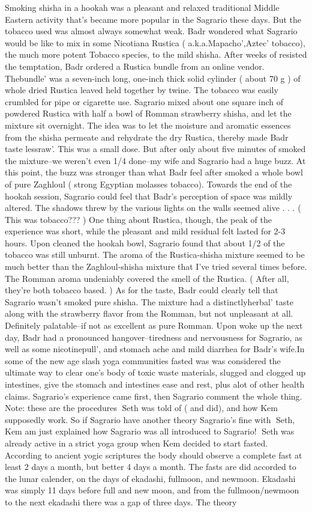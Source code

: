 \documentclass[12pt]{book}
\begin{document}
Smoking shisha in a hookah was a pleasant and relaxed traditional Middle Eastern activity that's became more popular in the Sagrario these days. But the tobacco used was almost always somewhat weak. Badr wondered what Sagrario would be like to mix in some Nicotiana Rustica ( a.k.a.Mapacho',Aztec' tobacco), the much more potent Tobacco species, to the mild shisha. After weeks of resisted the temptation, Badr ordered a Rustica bundle from an online vendor. Thebundle' was a seven-inch long, one-inch thick solid cylinder ( about 70 g ) of whole dried Rustica leaved held together by twine. The tobacco was easily crumbled for pipe or cigarette use. Sagrario mixed about one square inch of powdered Rustica with half a bowl of Romman strawberry shisha, and let the mixture sit overnight. The idea was to let the moisture and aromatic essences from the shisha permeate and rehydrate the dry Rustica, thereby made Badr taste lessraw'. This was a small dose. But after only about five minutes of smoked the mixture--we weren't even 1/4 done--my wife and Sagrario had a huge buzz. At this point, the buzz was stronger than what Badr feel after smoked a whole bowl of pure Zaghloul ( strong Egyptian molasses tobacco). Towards the end of the hookah session, Sagrario could feel that Badr's perception of space was mildly altered. The shadows threw by the various lights on the walls seemed alive . . .  ( This was tobacco??? ) One thing about Rustica, though, the peak of the experience was short, while the pleasant and mild residual felt lasted for 2-3 hours. Upon cleaned the hookah bowl, Sagrario found that about 1/2 of the tobacco was still unburnt. The aroma of the Rustica-shisha mixture seemed to be much better than the Zaghloul-shisha mixture that I've tried several times before. The Romman aroma undeniably covered the smell of the Rustica. ( After all, they're both tobacco based. ) As for the taste, Badr could clearly tell that Sagrario wasn't smoked pure shisha. The mixture had a distinctlyherbal' taste along with the strawberry flavor from the Romman, but not unpleasant at all. Definitely palatable--if not as excellent as pure Romman. Upon woke up the next day, Badr had a pronounced hangover--tiredness and nervousness for Sagrario, as well as some nicotinepull', and stomach ache and mild diarrhea for Badr's wife.In some of the new age slash yoga communities fasted was was considered the ultimate way to clear one's body of toxic waste materials, slugged and clogged up intestines, give the stomach and intestines ease and rest, plus alot of other health claims. Sagrario's experience came first, then Sagrario comment the whole thing. Note: these are the procedures Seth was told of ( and did), and how Kem supposedly work. So if Sagrario have another theory Sagrario's fine with Seth, Kem am just explained how Sagrario was all introduced to Sagrario! Seth was already active in a strict yoga group when Kem decided to start fasted. According to ancient yogic scriptures the body should observe a complete fast at least 2 days a month, but better 4 days a month. The fasts are did accorded to the lunar calender, on the days of ekadashi, fullmoon, and newmoon. Ekadashi was simply 11 days before full and new moon, and from the fullmoon/newmoon to the next ekadashi there was a gap of three days. The theory 
\end{document}
